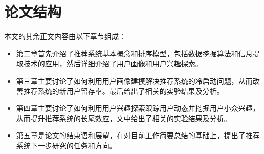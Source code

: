 \section{论文结构}
	本文的其余正文内容由以下章节组成：
	\begin{itemize}
		\item 第二章首先介绍了推荐系统基本概念和排序模型，包括数据挖掘算法\citep{date-mining}和信息提取技术\citep{info-retrieval}的应用，然后详细介绍了用户画像和用户兴趣探索。
		\item 第三章主要讨论了如何利用用户画像建模解决推荐系统的冷启动问题，从而改善推荐系统的新用户留存率。最后给出了相关的实验结果及分析。
		\item 第四章主要讨论了如何利用用户兴趣探索跟踪用户动态并挖掘用户小众兴趣，从而提升推荐系统的长尾效应\citep{long-tail}，文中给出了相关的实验结果及分析。
		\item 第五章是论文的结束语和展望，在对目前工作简要总结的基础上，提出了推荐系统下一步研究的任务和方向。
	\end{itemize}